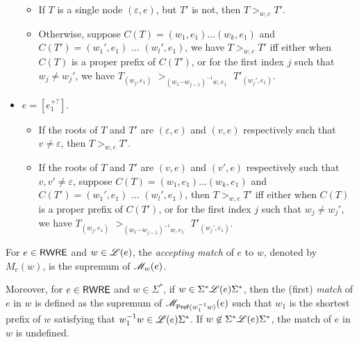 \begin{definition}
\begin{itemize}
\begin{itemize}
		\item If $T$ is a single node  $(\varepsilon, e)$, but $T'$ is not, then $T >_{w, e} T'$.
  		\item Otherwise, suppose $C(T) = (w_1, e_1) \ldots (w_k, e_1)$ and $C (T') =
  		(w_1', e_1)$ $\ldots$ $(w_l', e_1)$, we have $T >_{w,e} T'$ iff either when $C (T)$
  		is a proper prefix of $C (T')$, or for the first index $j$ such that $w_j
  		\neq w_j'$, we have $T_{(w_j, e_1)}$ $>_{(w_1\cdots w_{j-1})^{-1}w, e_1}$ $T'_{(w_j', e_1)}$.
		\end{itemize}
%
  		\item $e = [e_1^{+?}]$. 
		\begin{itemize}
		\item If the roots of $T$ and $T' $ are  $(\varepsilon, e)$ and $(v, e)$ respectively such that $v \neq \varepsilon$, then $T >_{w, e} T'$.
  		\item If the roots of $T$ and $T' $ are $(v, e)$ and $(v', e)$ respectively such that $v, v' \neq \varepsilon$,  suppose $C(T) = (w_1, e_1) \ldots (w_k, e_1)$ and $C (T') =
  		(w_1', e_1)$ $\ldots$ $(w_l', e_1)$, then $T >_{w,e} T'$ iff either when $C(T)$
  		is a proper prefix of $C (T')$, or for the first index $j$ such that $w_j
  		\neq w_j'$, we have $T_{(w_j, e_1)}$ $>_{(w_1\cdots w_{j-1})^{-1}w, e_1}$ $T'_{(w_j', e_1)}$.
		\end{itemize}
  	\end{itemize}
  	
  	For $e \in {\sf RWRE}$ and $w \in \mathscr{L}(e)$, the \emph{accepting match} of $e$ to $w$, denoted by $M_e(w)$, is the supremum of $\mathscr{M}_w(e)$.
  	
  	 Moreover,  for $e \in {\sf RWRE}$ and $w \in \Sigma^\ast$, if $w \in \Sigma^\ast \mathscr{L}(e)\Sigma^\ast$, then the (first) \emph{match} of $e$ in $w$ is defined as the supremum of $\mathscr{M}_{\mathsf{Pref}(w_1^{-1}w)}(e)$ such that $w_1$ is the shortest prefix of $w$ satisfying that $w_1^{-1}w \in \mathscr{L}(e)\Sigma^\ast$. If $w \not \in \Sigma^\ast \mathscr{L}(e)\Sigma^\ast$, the match of $e$ in $w$ is undefined.  
%  	
  \end{definition}

